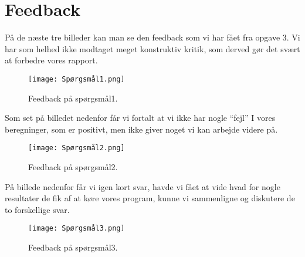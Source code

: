 \documentclass[class=report, crop=false]{standalone}
\begin{document}
    \section{Feedback}
    \label{Feedback}
    På de næste tre billeder kan man se den feedback som vi har fået fra opgave 3. Vi har som helhed ikke modtaget meget konstruktiv kritik, som derved gør det svært at forbedre vores rapport. 
    \begin{figure}[H]
        \centering
        \texttt{[image: Spørgsmål1.png]}
        \caption{Feedback på spørgsmål1.}
        \label{fig:Feedback1}
    \end{figure}

    \noindent Som set på billedet nedenfor får vi fortalt at vi ikke har nogle “fejl” I vores beregninger, som er positivt, men ikke giver noget vi kan arbejde videre på. 
    \begin{figure}[H]
        \centering
        \texttt{[image: Spørgsmål2.png]}
        \caption{Feedback på spørgsmål2.}
        \label{fig:Feedback2}
    \end{figure}
    
    \noindent På billede nedenfor får vi igen kort svar, havde vi fået at vide hvad for nogle resultater de fik af at køre vores program, kunne vi sammenligne og diskutere de to forskellige svar.
    \begin{figure}[H]
        \centering
        \texttt{[image: Spørgsmål3.png]}
        \caption{Feedback på spørgsmål3.}
        \label{fig:Feedback3}
    \end{figure}
\end{document}
